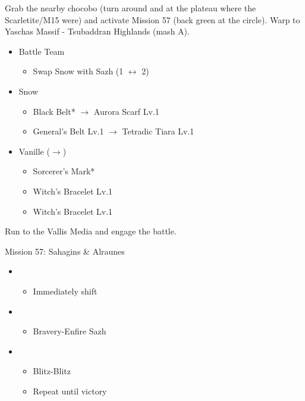 Grab the nearby chocobo (turn around and at the plateau where the Scarletite/M15 were) and activate Mission 57 (back green at the circle).
Warp to Yaschas Massif - Tsubaddran Highlands (mash A).
\vfill
\begin{menu}
	\begin{itemize}
	\paradigm
		\begin{itemize}
			\item Battle Team
				\begin{itemize}
					\item Swap Snow with Sazh (1 $\leftrightarrow$ 2)
				\end{itemize}
		\end{itemize}
	\equip
		\begin{itemize}
			\item Snow
				\begin{itemize}
					\item Black Belt* $\rightarrow$ Aurora Scarf Lv.1
					\item General's Belt Lv.1 $\rightarrow$ Tetradic Tiara Lv.1
				\end{itemize}
			\item Vanille ($\rightarrow$)
				\begin{itemize}
					\item Sorcerer's Mark*
					\item Witch's Bracelet Lv.1
					\item Witch's Bracelet Lv.1
				\end{itemize}
		\end{itemize}
	\end{itemize}
\end{menu}

Run to the Vallis Media and engage the battle.

\begin{battle}{Mission 57: Sahagins \& Alraunes}
	\begin{itemize}
		\item \sixth
			\begin{itemize}
				\item Immediately shift
			\end{itemize}
		\item \fifth
			\begin{itemize}
				\item Bravery-Enfire Sazh
			\end{itemize}
		\item \first
			\begin{itemize}
				\item Blitz-Blitz
				\item Repeat until victory
			\end{itemize}
	\end{itemize}
\end{battle}

